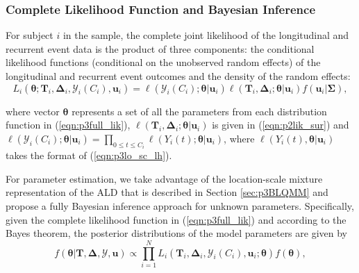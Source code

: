 

\subsubsection{Complete Likelihood Function and Bayesian Inference}\label{sec:p3estimation}
For subject $i$ in the sample, the complete joint likelihood of the longitudinal and recurrent event data is the product of three components: the conditional likelihood functions (conditional on the unobserved random effects) of the longitudinal and recurrent event outcomes and the density of the random effects:
\begin{equation}\label{eqn:p3full_lik}
L_i(\boldsymbol{\theta};{\boldsymbol T}_i, \boldsymbol{\Delta}_i, \mathcal{Y}_{i}(C_i), \boldsymbol{u}_i) = \ell(\mathcal{Y}_{i}(C_i); \boldsymbol{\theta}|\boldsymbol{u}_i)\ell({\boldsymbol T}_i, {\boldsymbol\Delta}_i; \boldsymbol{\theta}|\boldsymbol{u}_i)f(\boldsymbol{u}_i|\boldsymbol{\Sigma}),
\end{equation}

\noindent where vector $\boldsymbol{\theta}$ represents a set of all the parameters from each distribution function in (\ref{eqn:p3full_lik}),  $\ell(\boldsymbol{T}_i, \boldsymbol{\Delta}_i; \boldsymbol{\theta}|\boldsymbol{u}_i)$ is given in (\ref{eqn:p2lik_sur}) and $\ell(\mathcal{Y}_{i}(C_i); \boldsymbol{\theta}|\boldsymbol{u}_i)=\prod_{0\le t\le C_i}\ell(Y_{i}(t); \boldsymbol{\theta}|\boldsymbol{u}_i)$, where $\ell(Y_{i}(t), \boldsymbol{\theta}|\boldsymbol{u}_i)$ takes the format of (\ref{eqn:p3lo_sc_lh}).

For parameter estimation, we take advantage of the location-scale mixture representation of the ALD that is described in Section \ref{sec:p3BLQMM} and propose a fully Bayesian inference approach for unknown parameters. Specifically, given the complete likelihood function in (\ref{eqn:p3full_lik}) and according to the Bayes theorem, the posterior distributions of the model parameters are given by
\begin{equation}\label{eqn:p3posterior}
f(\boldsymbol{\theta}|\boldsymbol{T}, \boldsymbol{\Delta}, \bm{\mathcal{Y}}, \boldsymbol{u})\propto \prod_{i=1}^N L_i(\boldsymbol{T}_i, \boldsymbol{\Delta}_i, \mathcal{Y}_{i}(C_i), \boldsymbol{u}_i;\boldsymbol{\theta}) f(\boldsymbol{\theta}),
\end{equation}

